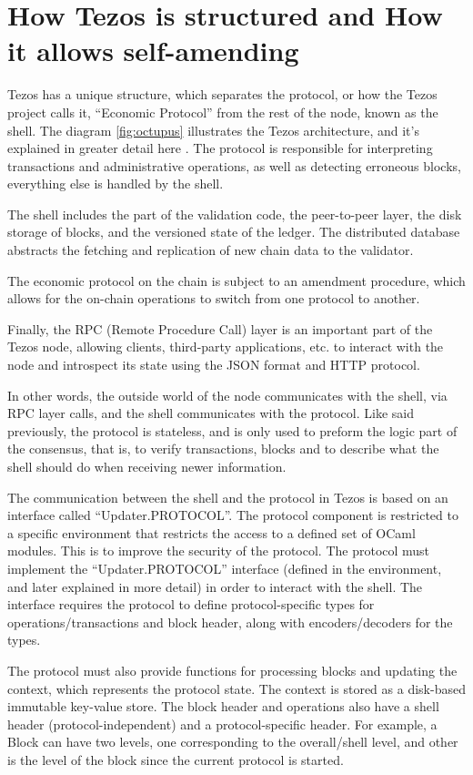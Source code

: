 \section{How Tezos is structured and How it allows self-amending}

Tezos has a unique structure, which separates the protocol, or how the Tezos project calls it, ``Economic Protocol'' from the rest of the node, known as the shell. The diagram \ref{fig:octupus} illustrates the Tezos architecture, and it's explained in greater detail here \cite{nomadiclabsdocs}.
The protocol is responsible for interpreting transactions and administrative operations, as well as detecting erroneous blocks, everything else is handled by the shell.

The shell includes the part of the validation code, the peer-to-peer layer, the disk storage of blocks, and the versioned state of the ledger.
The distributed database abstracts the fetching and replication of new chain data to the validator.

The economic protocol on the chain is subject to an amendment procedure, which allows for the on-chain operations to switch from one protocol to another.

Finally, the RPC (Remote Procedure Call) layer is an important part of the Tezos node, allowing clients, third-party applications, etc. to interact with the node and introspect its state using the JSON format and HTTP protocol.

In other words, the outside world of the node communicates with the shell, via RPC layer calls, and the shell communicates with the protocol. Like said previously, the protocol is stateless, and is only used to preform the logic part of the consensus, that is, to verify transactions, blocks and to describe what the shell should do when receiving newer information.

The communication between the shell and the protocol in Tezos is based on an interface called ``Updater.PROTOCOL''.
The protocol component is restricted to a specific environment that restricts the access to a defined set of OCaml modules. This is to improve the security of the protocol.
The protocol must implement the ``Updater.PROTOCOL'' interface (defined in the environment, and later explained in more detail) in order to interact with the shell. The interface requires the protocol to define protocol-specific types for operations/transactions and block header, along with encoders/decoders for the types.

The protocol must also provide functions for processing blocks and updating the context, which represents the protocol state. The context is stored as a disk-based immutable key-value store. The block header and operations also have a shell header (protocol-independent) and a protocol-specific header.
For example, a Block can have two levels, one corresponding to the overall/shell level, and other is the level of the block since the current protocol is started.

